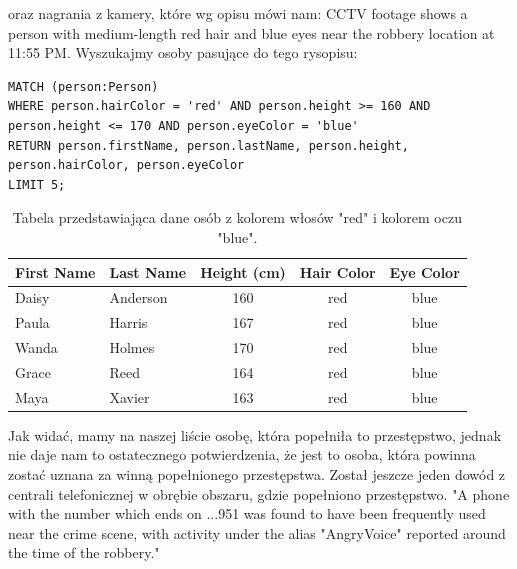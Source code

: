 \documentclass[a4paper,12pt]{article}
\begin{document}
oraz nagrania z kamery, które wg opisu mówi nam: CCTV footage shows a person with medium-length red hair and blue eyes near the robbery location at 11:55 PM.
\newline
\newline Wyszukajmy osoby pasujące do tego rysopisu:

\begin{center}
\begin{minipage}{0.8\linewidth}
\begin{lstlisting}[language=Cypher, basicstyle=\small, breaklines=true]
MATCH (person:Person)
WHERE person.hairColor = 'red' AND person.height >= 160 AND person.height <= 170 AND person.eyeColor = 'blue'
RETURN person.firstName, person.lastName, person.height, person.hairColor, person.eyeColor
LIMIT 5;
\end{lstlisting}
\end{minipage}
\end{center}

\begin{table}[h!]
\centering
\begin{tabular}{|l|l|c|c|c|}
\hline
\textbf{First Name} & \textbf{Last Name} & \textbf{Height (cm)} & \textbf{Hair Color} & \textbf{Eye Color} \\ \hline
Daisy               & Anderson           & 160                 & red                 & blue               \\ \hline
Paula               & Harris             & 167                 & red                 & blue               \\ \hline
Wanda               & Holmes             & 170                 & red                 & blue               \\ \hline
Grace               & Reed               & 164                 & red                 & blue               \\ \hline
Maya                & Xavier             & 163                 & red                 & blue               \\ \hline
\end{tabular}
\caption{Tabela przedstawiająca dane osób z kolorem włosów "red" i kolorem oczu "blue".}
\label{tab:person_data_with_eyes}
\end{table}

Jak widać, mamy na naszej liście osobę, która popełniła to przestępstwo, jednak nie daje nam to ostatecznego potwierdzenia, że jest to osoba, która powinna zostać uznana za winną popełnionego przestępstwa. Został jeszcze jeden dowód z centrali telefonicznej w obrębie obszaru, gdzie popełniono przestępstwo.
\newline
\newline
"A phone with the number which ends on ...951 was found to have been frequently used near the crime scene, with activity under the alias "AngryVoice" reported around the time of the robbery."
\end{document}
